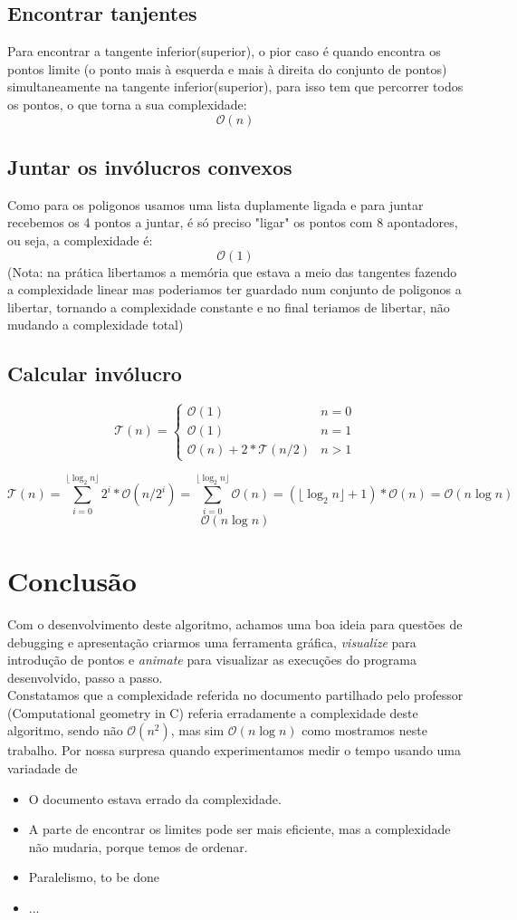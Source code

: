 \documentclass[11pt]{article}
\begin{document}
\subsection{Encontrar tanjentes}
Para encontrar a tangente inferior(superior),
o pior caso é quando encontra os pontos limite
(o ponto mais à esquerda e mais à direita do conjunto de pontos) 
simultaneamente na tangente inferior(superior), 
para isso tem que percorrer todos os pontos,
o que torna a sua complexidade: 
$$\mathcal{O}(n)$$

\subsection{Juntar os invólucros convexos}
Como para os poligonos usamos uma lista duplamente ligada e
para juntar recebemos os 4 pontos a juntar, é só preciso 
"ligar" os pontos com 8 apontadores, ou seja, a complexidade é: 
$$\mathcal{O}(1)$$
(Nota: na prática libertamos a memória que estava 
a meio das tangentes fazendo a complexidade linear
mas poderiamos ter guardado num conjunto de poligonos 
a libertar, tornando a complexidade constante e no final 
teriamos de libertar, não mudando a complexidade total)

\subsection{Calcular invólucro}
$$
    \mathcal{T}(n) = 
        \begin{cases}
            \mathcal{O}(1)                      & n = 0\\
            \mathcal{O}(1)                      & n = 1\\
            \mathcal{O}(n) + 2*\mathcal{T}(n/2) & n > 1
        \end{cases}
$$

$$
    \mathcal{T}(n) = \sum_{i=0}^{\lfloor\log_{2}n\rfloor} 2^i*\mathcal{O}(n/2^i)
    = \sum_{i=0}^{\lfloor\log_{2}n\rfloor} \mathcal{O}(n)
    = (\lfloor\log_{2}n\rfloor + 1)*\mathcal{O}(n)
    = \mathcal{O}(n\log{n})
$$
$$
    \mathcal{O}(n\log{n})
$$


\section{Conclusão}
Com o desenvolvimento deste algoritmo, achamos uma boa ideia 
para questões de debugging e apresentação criarmos uma ferramenta
gráfica, \textit{visualize} para introdução de pontos e \textit{animate}
para visualizar as execuções do programa desenvolvido, passo a passo.\\
Constatamos que a complexidade referida no documento partilhado 
pelo professor (Computational geometry in C) referia erradamente 
a complexidade deste algoritmo, sendo não $\mathcal{O}(n^2)$, mas sim
$\mathcal{O}(n\log{n})$ como mostramos neste trabalho. Por nossa
surpresa quando experimentamos medir o tempo usando uma variadade de \\

\begin{itemize}
    \item O documento estava errado da complexidade.
    \item A parte de encontrar os limites pode ser mais eficiente, 
        mas a complexidade não mudaria, porque temos de ordenar.
    \item Paralelismo, to be done
    \item ...
\end{itemize}
\end{document}
